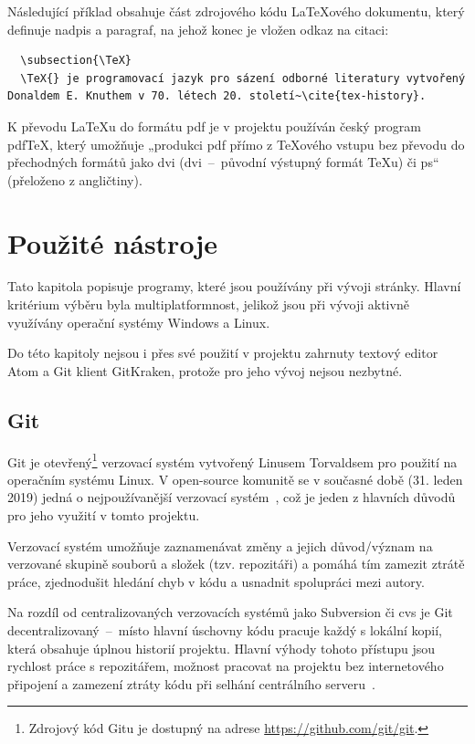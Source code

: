 \documentclass[a4paper, 12pt, twoside]{article}
\begin{document}
  Následující příklad obsahuje část zdrojového kódu \LaTeX ového dokumentu, který definuje nadpis a paragraf, na jehož konec je vložen odkaz na citaci:

  \begin{verbatim}
  \subsection{\TeX}
  \TeX{} je programovací jazyk pro sázení odborné literatury vytvořený Donaldem E. Knuthem v 70. létech 20. století~\cite{tex-history}.
  \end{verbatim}

  K převodu \LaTeX u do formátu \gls{pdf} je v projektu používán český program pdf\TeX, který umožňuje „produkci \gls{pdf} přímo z \TeX ového vstupu bez převodu do přechodných formátů jako \acrshort{dvi} (\acrlong{dvi}~--~původní výstupný formát \TeX u) či \gls{ps}“~\cite{pdftex} (přeloženo z angličtiny).


  \section{Použité nástroje} \label{sec:Použité nástroje}
  Tato kapitola popisuje programy, které jsou používány při vývoji stránky. Hlavní kritérium výběru byla multiplatformnost, jelikož jsou při vývoji aktivně využívány operační systémy Windows a Linux.

  Do této kapitoly nejsou i přes své použití v projektu zahrnuty textový editor Atom a Git klient GitKraken, protože pro jeho vývoj nejsou nezbytné.


  \subsection{Git} \label{sec:Git}
  Git je otevřený\footnote{Zdrojový kód Gitu je dostupný na adrese \url{https://github.com/git/git}.} verzovací systém vytvořený Linusem Torvaldsem pro použití na operačním systému Linux. V open-source komunitě se v současné době (31. leden 2019) jedná o nejpoužívanější verzovací systém~\cite{version-control-usage-statistics}, což je jeden z hlavních důvodů pro jeho využití v tomto projektu.

  Verzovací systém umožňuje zaznamenávat změny a jejich důvod/význam na verzované skupině souborů a složek (tzv. repozitáři) a pomáhá tím zamezit ztrátě práce, zjednodušit hledání chyb v kódu a usnadnit spolupráci mezi autory.

  Na rozdíl od centralizovaných verzovacích systémů jako Subversion či \gls{cvs} je Git decentralizovaný~--~místo hlavní úschovny kódu pracuje každý s lokální kopií, která obsahuje úplnou historií projektu. Hlavní výhody tohoto přístupu jsou rychlost práce s repozitářem, možnost pracovat na projektu bez internetového připojení a zamezení ztráty kódu při selhání centrálního serveru~\cite{cvcs-vs-dvcs}.
\end{document}
